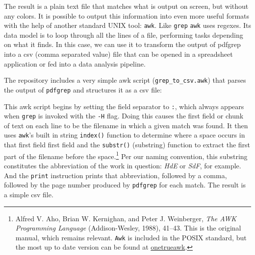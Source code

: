 \documentclass[
  letterpaper,
]{tufte-handout}
\newenvironment{Shaded}{\begin{snugshade}}{\end{snugshade}}
\newcommand{\BuiltInTok}[1]{\textcolor[rgb]{0.39,0.29,0.61}{\textbf{#1}}}
\newcommand{\CommentTok}[1]{\textcolor[rgb]{0.54,0.53,0.53}{#1}}
\newcommand{\ControlFlowTok}[1]{\textcolor[rgb]{0.12,0.11,0.11}{\textbf{#1}}}
\newcommand{\DataTypeTok}[1]{\textcolor[rgb]{0.00,0.34,0.68}{#1}}
\newcommand{\DecValTok}[1]{\textcolor[rgb]{0.69,0.50,0.00}{#1}}
\newcommand{\FunctionTok}[1]{\textcolor[rgb]{0.39,0.29,0.61}{#1}}
\newcommand{\KeywordTok}[1]{\textcolor[rgb]{0.12,0.11,0.11}{\textbf{#1}}}
\newcommand{\NormalTok}[1]{\textcolor[rgb]{0.12,0.11,0.11}{#1}}
\newcommand{\OperatorTok}[1]{\textcolor[rgb]{0.12,0.11,0.11}{#1}}
\newcommand{\StringTok}[1]{\textcolor[rgb]{0.75,0.01,0.01}{#1}}
\begin{document}
The result is a plain text file that matches what is output on screen,
but without any colors. It is possible to output this information into
even more useful formats with the help of another standard UNIX tool:
\texttt{awk}. Like \texttt{grep} \texttt{awk} uses regexes. Its data
model is to loop through all the lines of a file, performing tasks
depending on what it finds. In this case, we can use it to transform the
output of pdfgrep into a csv (comma separated value) file that can be
opened in a spreadsheet application or fed into a data analysis
pipeline.

The repository includes a very simple awk script
(\texttt{grep\_to\_csv.awk}) that parses the output of \texttt{pdfgrep}
and structures it as a csv file:

\begin{Shaded}
\end{Shaded}

This awk script begins by setting the field separator to \texttt{:},
which always appears when \texttt{grep} is invoked with the \texttt{-H}
flag. Doing this causes the first field or chunk of text on each line to
be the filename in which a given match was found. It then uses
\texttt{awk}'s built in string \texttt{index()} function to determine
where a space occurs in that first field first field and the
\texttt{substr()} (substring) function to extract the first part of the
filename before the space.\footnote{Alfred V. Aho, Brian W. Kernighan,
  and Peter J. Weinberger, \emph{The AWK Programming Language}
  (Addison-Wesley, 1988), 41--43. This is the original manual, which
  remains relevant. \texttt{Awk} is included in the POSIX standard, but
  the most up to date version can be found at
  \href{https://github.com/onetrueawk/awk}{onetrueawk}.} Per our naming
convention, this substring constitutes the abbreviation of the work in
question: \emph{HdE} or \emph{SdF}, for example. And the \texttt{print}
instruction prints that abbreviation, followed by a comma, followed by
the page number produced by \texttt{pdfgrep} for each match. The result
is a simple csv file.
\end{document}
